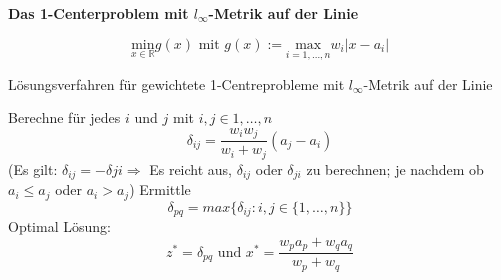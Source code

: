           \par \textbf{Das 1-Centerproblem mit $l_{\infty}$-Metrik auf der Linie}

          \[
            \underset{x \in \mathbb{R}}{\text{min}}g(x) \text{ mit } g(x) := \underset{i = 1, \dots, n}{\text{max}}w_i|x-a_i|
          \]
          \begin{algorithm}[H]
            \caption{Lösungsverfahren für gewichtete 1-Centreprobleme mit $l_{\infty}$-Metrik auf der Linie}
            \begin{algorithmic}[1]
              \State Berechne für jedes $i$ und $j$ mit $i, j \in {1, \dots, n}$
              \begin{equation*}
                \delta_{ij} = \frac{w_iw_j}{w_i+w_j}(a_j - a_i)
              \end{equation*}
              (Es gilt: $\delta_{ij} = -\delta{ji} \Rightarrow $ Es reicht aus, $\delta_{ij}$ oder $\delta_{ji}$ zu berechnen; je nachdem ob $a_i \leq a_j$ oder $a_i > a_j$)
              \State Ermittle 
              \begin{equation*}
                \delta_{pq} = max\{\delta_{ij}: i, j \in \{1, \dots, n\}\}
              \end{equation*}
              \State Optimal Lösung:
              \begin{equation*}
                z^* = \delta_{pq} \text{ und } x^{*} = \frac{w_pa_p + w_qa_q}{w_p + w_q}
              \end{equation*}
              
            \end{algorithmic}
          \end{algorithm}

          \begin{exmp}
            
          \end{exmp}

